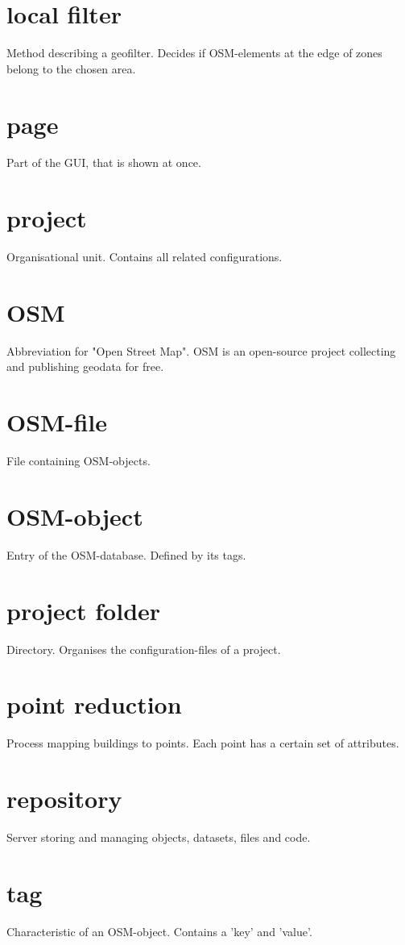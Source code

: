 \documentclass[parskip=full]{report} %
\begin{document}
\section*{local filter}
Method describing a geofilter. Decides if OSM-elements at the edge of zones belong to the chosen area.

\section*{page}
Part of the GUI, that is shown at once.

\section*{project}
Organisational unit. Contains all related configurations.

\section*{OSM}
Abbreviation for "Open Street Map". OSM is an open-source project collecting and publishing geodata for free.

\section*{OSM-file}
File containing OSM-objects.

\section*{OSM-object}
Entry of the OSM-database. Defined by its tags.

\section*{project folder}
Directory. Organises the configuration-files of a project.

\section*{point reduction}
Process mapping buildings to points. Each point has a certain set of attributes. 

\section*{repository}
Server storing and managing objects, datasets, files and code.

\section*{tag}
Characteristic of an OSM-object. Contains a 'key' and 'value'.
\end{document}
